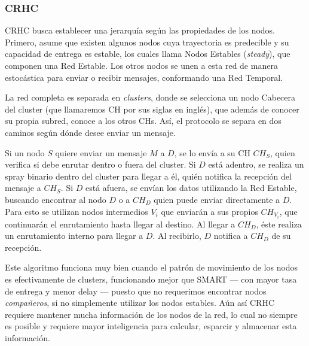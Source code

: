 \subsubsection{CRHC}

CRHC\cite{crhc} busca establecer una jerarquía según las propiedades de los nodos. Primero, asume que existen algunos nodos cuya trayectoria es predecible y su capacidad de entrega es estable, los cuales llama Nodos Estables (\emph{steady}), que componen una Red Estable. Los otros nodos se unen a esta red de manera estocástica para enviar o recibir mensajes, conformando una Red Temporal.

La red completa es separada en \emph{clusters}, donde se selecciona un nodo Cabecera del cluster (que llamaremos CH por sus siglas en inglés), que además de conocer su propia subred, conoce a los otros CHs. Así, el protocolo se separa en dos caminos según dónde desee enviar un mensaje.

Si un nodo $S$ quiere enviar un mensaje $M$ a $D$, se lo envía a su CH $CH_S$, quien verifica si debe enrutar dentro o fuera del cluster. Si $D$ está adentro, se realiza un spray binario dentro del cluster para llegar a él, quién notifica la recepción del mensaje a $CH_S$. Si $D$ está afuera, se envían los datos utilizando la Red Estable, buscando encontrar al nodo $D$ o a $CH_D$ quien puede enviar directamente a $D$. Para esto se utilizan nodos intermedios $V_i$ que enviarán a sus propios $CH_{V_i}$, que continuarán el enrutamiento hasta llegar al destino. Al llegar a $CH_D$, éste realiza un enrutamiento interno para llegar a $D$. Al recibirlo, $D$ notifica a $CH_D$ de su recepción.

Este algoritmo funciona muy bien cuando el patrón de movimiento de los nodos es efectivamente de clusters, funcionando mejor que SMART --- con mayor tasa de entrega y menor delay --- puesto que no requerimos encontrar nodos \emph{compañeros}, si no simplemente utilizar los nodos estables. Aún así CRHC requiere mantener mucha información de los nodos de la red, lo cual no siempre es posible y requiere mayor inteligencia para calcular, esparcir y almacenar esta información.
